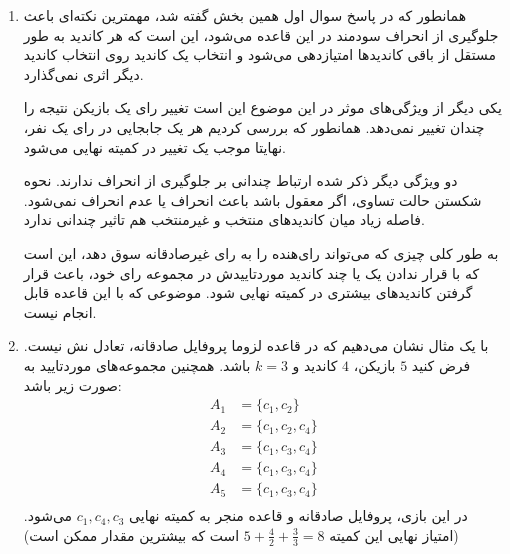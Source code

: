 \documentclass[12pt]{article}
\begin{document}
\begin{enumerate}
{            در سوال اول همین بخش ثابت کردیم که رای صادقانه، همیشه بهترین 
            پاسخ است. (در واقع در اثبات آن از اینکه استراتژی باقی 
            رای‌دهنده‌ها چیست استفاده نکردیم)
            پس جواب این سوال 
            "بله"
            است.
        }
        \item {
            همانطور که در پاسخ سوال اول همین بخش گفته شد، مهمترین نکته‌ای
            باعث جلوگیری از انحراف سودمند در این قاعده می‌شود، این
            است که هر کاندید به طور مستقل از باقی کاندیدها امتیازدهی
            می‌شود و انتخاب یک کاندید روی انتخاب کاندید دیگر اثری نمی‌گذارد.

            یکی دیگر از ویژگی‌های موثر در این موضوع این است تغییر
            رای یک بازیکن نتیجه را چندان تغییر نمی‌دهد. همانطور که بررسی کردیم
            هر یک جابجایی در رای یک نفر، نهایتا موجب یک تغییر در کمیته نهایی
            می‌شود.

            دو ویژگی دیگر ذکر شده ارتباط چندانی بر جلوگیری از انحراف ندارند.
            نحوه شکستن حالت تساوی، اگر معقول باشد باعث انحراف یا عدم انحراف نمی‌شود.
            فاصله زیاد میان کاندیدهای منتخب و غیرمنتخب هم تاثیر چندانی ندارد.

            به طور کلی چیزی که می‌تواند رای‌هنده را به رای غیرصادقانه سوق دهد،
            این است که با قرار ندادن یک یا چند کاندید موردتاییدش
            در مجموعه رای خود، باعث قرار گرفتن کاندیدهای بیشتری در کمیته نهایی شود.
            موضوعی که با این قاعده قابل انجام نیست.
        }
        \item {
            با یک مثال نشان می‌دهیم که در قاعده 
            لزوما پروفایل صادقانه، تعادل نش نیست.
            فرض کنید 
            $5$ بازیکن،
            $4$ کاندید
            و $k = 3$
            باشد. همچنین مجموعه‌های موردتایید به صورت زیر باشد:
            \begin{align*}
                A_1 &= \{c_1, c_2 \} \\
                A_2 &= \{c_1, c_2, c_4\} \\
                A_3 &= \{c_1, c_3, c_4 \} \\
                A_4 &= \{c_1, c_3, c_4 \} \\
                A_5 &= \{c_1, c_3, c_4 \} \\
            \end{align*}
            در این بازی، پروفایل صادقانه و قاعده
            منجر به کمیته نهایی 
            $c_1, c_4, c_3$
            می‌شود.
            (امتیاز نهایی این کمیته $5 + \frac{4}{2} + \frac{3}{3} = 8$ است
            که بیشترین مقدار ممکن است)

}
\end{enumerate}
\end{document}
